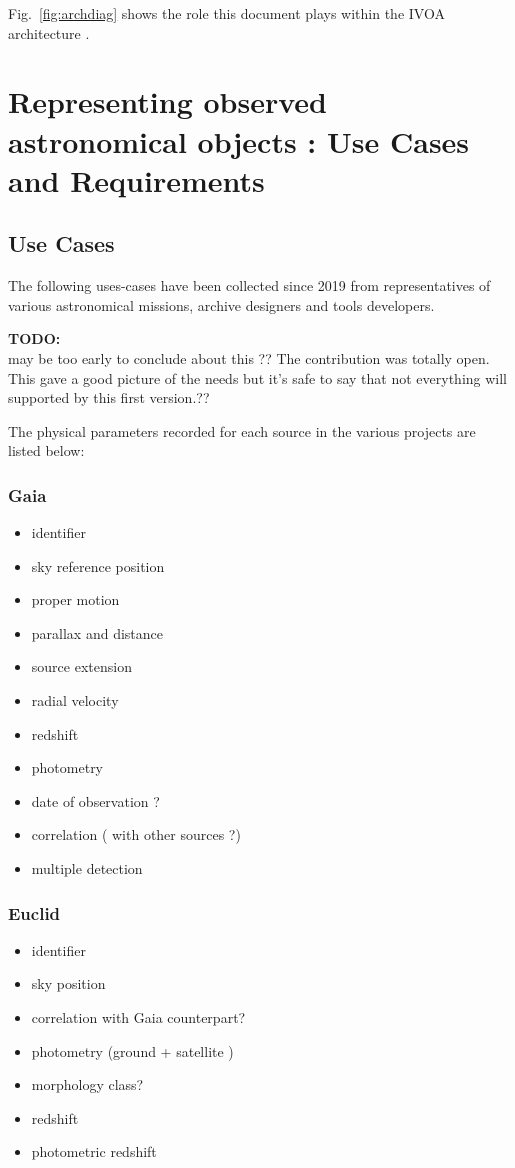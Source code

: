\documentclass[11pt,a4paper]{ivoa}
\newcommand{\TODO}[1]{%
    \noindent%
    \colorbox{todocolor}{%
            \parbox{0.85\linewidth}{\sffamily \textbf{TODO:}\\
            #1}
    }%
    \vspace{2pt}

}
\begin{document}
Fig.~\ref{fig:archdiag} shows the role this document plays within the
IVOA architecture \citep{note:VOARCH}.



\section{Representing observed astronomical objects : Use Cases and  Requirements}

\subsection{Use Cases}
The following uses-cases have been collected since 2019 from representatives of various astronomical missions, archive designers and tools developers.
\TODO{ may be too early to conclude about this ?? The contribution was totally open. This gave a good picture of the needs but it's safe to say that not everything will supported by this first version.??}

The physical parameters recorded for each source in the various projects are listed below:
\subsubsection{Gaia}
\begin{itemize}
    \item identifier
    \item sky reference position
    \item proper motion
    \item parallax and distance

    \item source extension
    \item radial velocity
    \item redshift
    \item photometry
    \item date of observation ?
    \item correlation ( with other sources ?)
    \item multiple detection
\end{itemize}


\subsubsection{Euclid}
\begin{itemize}
    \item identifier
    \item sky position
    \item correlation with Gaia counterpart?
    \item photometry (ground + satellite )
    \item morphology class?
    \item redshift
    \item photometric redshift
\end{itemize}
\end{document}

